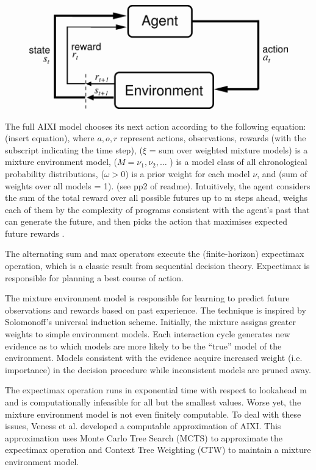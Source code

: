 \documentclass{article}
\theoremstyle{definition}
\newtheorem{primary statistics}[definition]{Primary Statistics}
\newtheorem{auxiliary statistics}[definition]{Auxiliary Statistics}
\begin{document}
\begin{figure}
\includegraphics[width = 12cm]{suttonbarto_rl}
	\caption{\citep{sutton1998reinforcement}}
\end{figure}
 
The full AIXI model chooses its next action according to the following equation: (insert equation), where $a,o,r$ represent actions, observations, rewards (with the subscript indicating the time step), ($\xi$ = sum over weighted mixture models) is a mixture environment model, ($M = \nu_1,\nu_2,\ldots$ ) is a model class of all chronological probability distributions, ($\omega > 0$) is a prior weight for each model $\nu$, and (sum of weights over all models = 1). (see pp2 of readme). Intuitively, the agent considers the sum of the total reward over all possible futures up to m steps ahead, weighs each of them by the complexity of programs consistent with the agent’s past that can generate the future, and then picks the action that maximises expected future rewards \citep{veness2011monte}. 

The alternating sum and max operators execute the (finite-horizon) expectimax operation, which is a classic result from sequential decision theory. Expectimax is responsible for planning a best course of action.

The mixture environment model is responsible for learning to predict future observations and rewards based on past experience. The technique is inspired by Solomonoff’s universal induction scheme. Initially, the mixture assigns greater weights to simple environment models. Each interaction cycle generates new evidence as to which models are more likely to be the “true” model of the environment. Models consistent with the evidence acquire increased weight (i.e. importance) in the decision procedure while inconsistent models are pruned away.

The expectimax operation runs in exponential time with respect to lookahead m and is computationally infeasible for all but the smallest values. Worse yet, the mixture environment model is not even finitely computable. To deal with these issues, Veness et al. developed a computable approximation of AIXI. This approximation uses Monte Carlo Tree Search (MCTS) to approximate the expectimax operation and Context Tree Weighting (CTW) to maintain a mixture environment model. 
\end{document}
